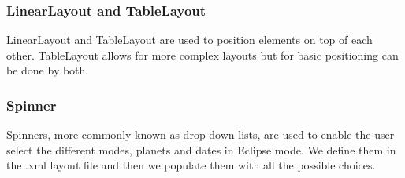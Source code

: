 \subsubsection{LinearLayout and TableLayout}
LinearLayout and TableLayout are used to position elements on top of each other. TableLayout allows for more complex layouts but for basic positioning can be done by both.

\subsubsection{Spinner}

Spinners, more commonly known as drop-down lists, are used to enable the user select the different modes, planets and dates in Eclipse mode. We define them in the .xml layout file and then we populate them with all the possible choices.


















